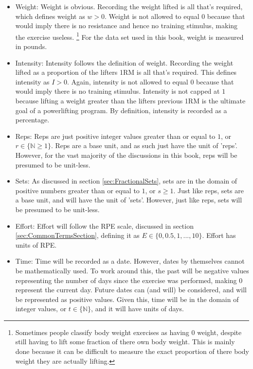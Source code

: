 \begin{itemize}
	\item Weight: Weight is obvious. Recording the weight lifted is all that's required, which defines weight as $w>0$. Weight is not allowed to equal $0$ because that would imply there is no resistance and hence no training stimulus, making the exercise useless. \footnote{Sometimes people classify body weight exercises as having $0$ weight, despite still having to lift some fraction of there own body weight. This is mainly done because it can be difficult to measure the exact proportion of there body weight they are actually lifting.} For the data set used in this book, weight is measured in pounds.
	
	\item Intensity: Intensity follows the definition of weight. Recording the weight lifted as a proportion of the lifters 1RM is all that's required. This defines intensity as $I>0$. Again, intensity is not allowed to equal $0$ because that would imply there is no training stimulus. Intensity is not capped at $1$ because lifting a weight greater than the lifters previous 1RM is the ultimate goal of a powerlifting program. By definition, intensity is recorded as a percentage.
	
	\item Reps: Reps are just positive integer values greater than or equal to $1$, or $r\in \{ \mathbb{N} \ge 1 \}$. Reps are a base unit, and as such just have the unit of 'reps'. However, for the vast majority of the discussions in this book, reps will be presumed to be unit-less.
	
	\item Sets: As discussed in section \ref{sec:FractionalSets}, sets are in the domain of positive numbers greater than or equal to $1$, or $s\ge 1$. Just like reps, sets are a base unit, and will have the unit of 'sets'. However, just like reps, sets will be presumed to be unit-less.
	
	\item Effort: Effort will follow the RPE scale, discussed in section \ref{sec:CommonTermsSection}, defining it as $E\in \{0,0.5,1,...,10\}$. Effort has units of RPE.
	
	\item Time: Time will be recorded as a date. However, dates by themselves cannot be mathematically used. To work around this, the past will be negative values representing the number of days since the exercise was performed, making $0$ represent the current day. Future dates can (and will) be considered, and will be represented as positive values. Given this, time will be in the domain of integer values, or $t\in \{ \mathbb{N} \}$, and it will have units of days.
	

\end{itemize}
